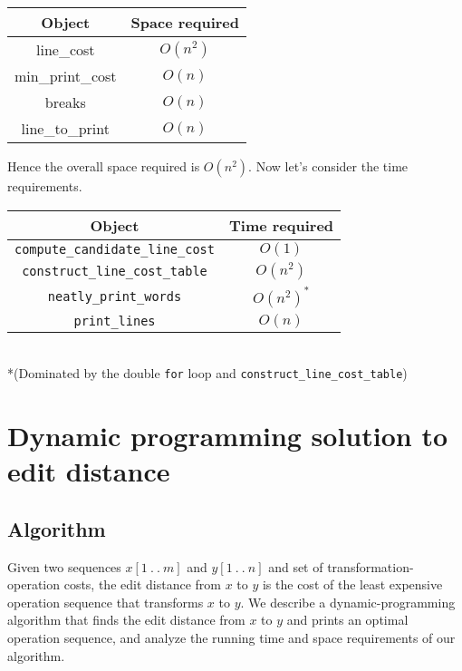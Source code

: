 \documentclass[paper=a4, fontsize=11pt]{scrartcl} %
\numberwithin{equation}{section} %
\numberwithin{figure}{section} %
\numberwithin{table}{section} %
\begin{document}
\begin{center}
\begin{tabular}{ | c | c | }
\hline
\textbf{Object} & \textbf{Space required} \\
\hline
line\_cost & $O(n^2)$ \\
\hline
min\_print\_cost & $O(n)$ \\
\hline
breaks & $O(n)$ \\
\hline
line\_to\_print & $O(n)$ \\
\hline
\end{tabular}
\end{center}

Hence the overall space required is $O(n^2)$. Now let's consider the time requirements.

\begin{center}
\begin{tabular}{ | c | c | }
\hline
\textbf{Object} & \textbf{Time required} \\
\hline
\texttt{compute\_candidate\_line\_cost} & $O(1)$ \\
\hline
\texttt{construct\_line\_cost\_table} & $O(n^2)$ \\
\hline
\texttt{neatly\_print\_words} & $O(n^2)^*$ \\
\hline
\texttt{print\_lines} & $O(n)$ \\
\hline
\end{tabular} \\
*(Dominated by the double \texttt{for} loop and \texttt{construct\_line\_cost\_table})
\end{center}

\section{Dynamic programming solution to edit distance}

\subsection{Algorithm}

Given two sequences $x[1~.~.~m]$ and $y[1~.~.~n]$ and set of transformation-operation costs, the edit distance from $x$ to $y$ is the cost of the least expensive operation sequence that transforms $x$ to $y$. We describe a dynamic-programming algorithm that finds the edit distance from $x$ to $y$ and prints an optimal operation sequence, and analyze the running time and space requirements of our algorithm.\\
\end{document}
